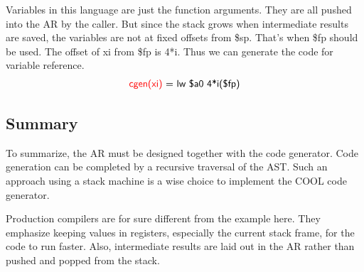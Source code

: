 Variables in this language are just the function arguments. They are all pushed into the AR by the caller. But since the stack grows when intermediate results are saved, the variables are not at fixed offsets from \$sp. That's when \$fp should be used. The offset of \textsf{xi} from \$fp is 4*i. Thus we can generate the code for variable reference. 
\begin{equation*}
\textsf{\color{red}cgen(xi)}\textsf{ = lw \$a0 4*i(\$fp)}
\end{equation*}
\subsection{Summary}
To summarize, the AR must be designed together with the code generator. Code generation can be completed by a recursive traversal of the AST. Such an approach using a stack machine is a wise choice to implement the COOL code generator. 

Production compilers are for sure different from the example here. They emphasize keeping values in registers, especially the current stack frame, for the code to run faster. Also, intermediate results are laid out in the AR rather than pushed and popped from the stack. 
